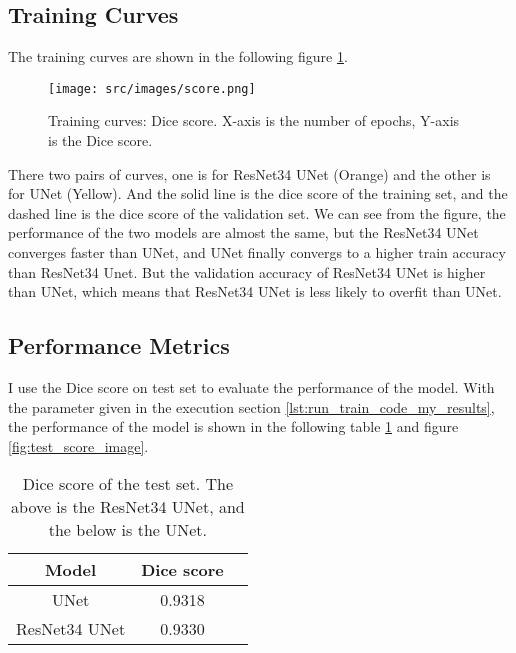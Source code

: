 
\subsection{Training Curves}
The training curves are shown in the following figure \ref{fig:train_score}.

\begin{figure}[hb]
    \centering
    \texttt{[image: src/images/score.png]}
    \caption{Training curves: Dice score. X-axis is the number of epochs, Y-axis is the Dice score.}
    \label{fig:train_score}
\end{figure}

There two pairs of curves, one is for ResNet34 UNet (Orange) and the other is for UNet (Yellow). And the solid line is the dice score of the training set, and the dashed line is the dice score of the validation set.
We can see from the figure, the performance of the two models are almost the same, but the ResNet34 UNet converges faster than UNet, and UNet finally convergs to a higher train accuracy than ResNet34 Unet.
But the validation accuracy of ResNet34 UNet is higher than UNet, which means that ResNet34 UNet is less likely to overfit than UNet.

\subsection{Performance Metrics}
I use the Dice score on test set to evaluate the performance of the model. With the parameter given in the execution section \ref{lst:run_train_code_my_results}, the performance of the model is shown in the following table \ref{tab:test_score} and figure \ref{fig:test_score_image}. 

\begin{table}[hb]
    \centering
    \begin{tabular}{|c|c|c|}
        \hline
        Model & Dice score\\
        \hline
        UNet & 0.9318\\
        ResNet34 UNet & 0.9330\\
        \hline
    \end{tabular}
    \caption{Dice score of the test set. The above is the ResNet34 UNet, and the below is the UNet.}
    \label{tab:test_score}
\end{table}

